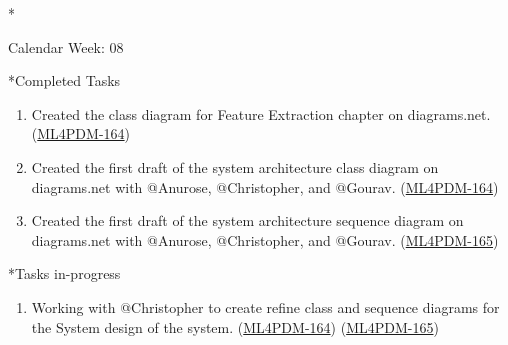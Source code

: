 \documentclass[11pt,a4paper]{article}
\begin{document}
\newpage
\begin{section}*{Calendar Week: 08 \hfill \date{26 February, 2021}}
 \begin{subsection}*{Completed Tasks}
     \begin{enumerate}
         \item
               Created the class diagram for Feature Extraction chapter on diagrams.net.
               (\href{https://ml4pdm.atlassian.net/browse/ML4PDM-164}{ML4PDM-164})
         \item
               Created the first draft of the system architecture class diagram on diagrams.net with @Anurose, @Christopher, and @Gourav. (\href{https://ml4pdm.atlassian.net/browse/ML4PDM-164}{ML4PDM-164})
         \item
               Created the first draft of the system architecture sequence diagram on diagrams.net with @Anurose, @Christopher, and @Gourav. (\href{https://ml4pdm.atlassian.net/browse/ML4PDM-165}{ML4PDM-165})
     \end{enumerate}
 \end{subsection}

 \begin{subsection}*{Tasks in-progress}
     \begin{enumerate}
         \item
               Working with @Christopher to create refine class and sequence diagrams for the System design of the system. (\href{https://ml4pdm.atlassian.net/browse/ML4PDM-164}{ML4PDM-164}) (\href{https://ml4pdm.atlassian.net/browse/ML4PDM-165}{ML4PDM-165})
     \end{enumerate}
 \end{subsection}
\end{section}
\end{document}

